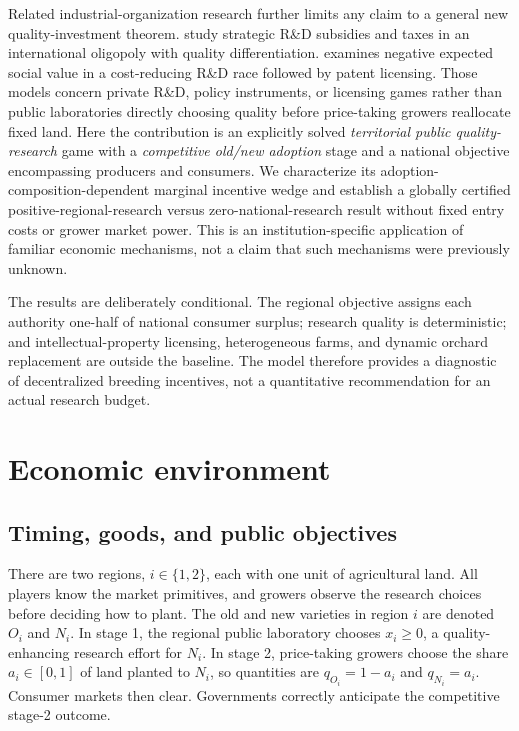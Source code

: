 \documentclass[11pt,a4paper]{article}
\begin{document}
Related industrial-organization research further limits any claim to a general new quality-investment theorem. \citet{jinji2013strategic} study strategic R\&D subsidies and taxes in an international oligopoly with quality differentiation. \citet{zhang2022negative} examines negative expected social value in a cost-reducing R\&D race followed by patent licensing. Those models concern private R\&D, policy instruments, or licensing games rather than public laboratories directly choosing quality before price-taking growers reallocate fixed land. Here the contribution is an explicitly solved \emph{territorial public quality-research} game with a \emph{competitive old/new adoption} stage and a national objective encompassing producers and consumers. We characterize its adoption-composition-dependent marginal incentive wedge and establish a globally certified positive-regional-research versus zero-national-research result without fixed entry costs or grower market power. This is an institution-specific application of familiar economic mechanisms, not a claim that such mechanisms were previously unknown.

The results are deliberately conditional. The regional objective assigns each authority one-half of national consumer surplus; research quality is deterministic; and intellectual-property licensing, heterogeneous farms, and dynamic orchard replacement are outside the baseline. The model therefore provides a diagnostic of decentralized breeding incentives, not a quantitative recommendation for an actual research budget.

\section{Economic environment}
\subsection{Timing, goods, and public objectives}
There are two regions, $i\in\{1,2\}$, each with one unit of agricultural land. All players know the market primitives, and growers observe the research choices before deciding how to plant. The old and new varieties in region $i$ are denoted $O_i$ and $N_i$. In stage 1, the regional public laboratory chooses $x_i\geq 0$, a quality-enhancing research effort for $N_i$. In stage 2, price-taking growers choose the share $a_i\in[0,1]$ of land planted to $N_i$, so quantities are $q_{O_i}=1-a_i$ and $q_{N_i}=a_i$. Consumer markets then clear. Governments correctly anticipate the competitive stage-2 outcome.
\end{document}
